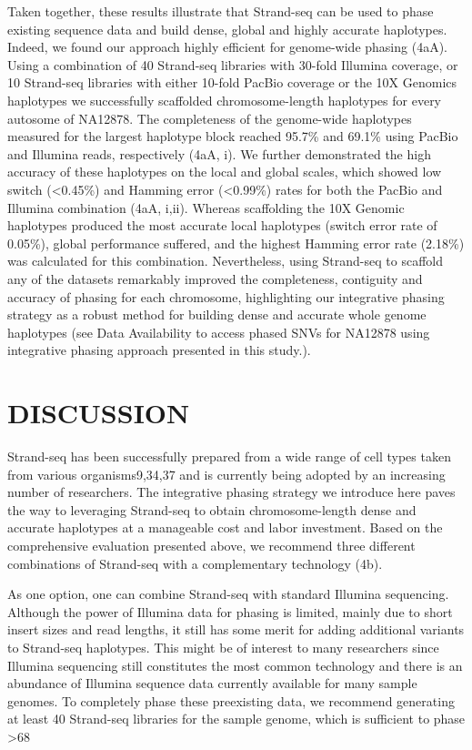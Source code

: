     Taken together, these results illustrate that Strand-seq can be used to phase existing sequence data and build dense, global and highly accurate haplotypes. 
    Indeed, we found our approach highly efficient for genome-wide phasing (4aA). Using a combination of 40 Strand-seq libraries with 30-fold Illumina coverage, 
    or 10 Strand-seq libraries with either 10-fold PacBio coverage or the 10X Genomics haplotypes we successfully scaffolded chromosome-length haplotypes for every autosome of NA12878. 
    The completeness of the genome-wide haplotypes measured for the largest haplotype block reached 95.7\% and 69.1\% using PacBio and Illumina reads, respectively (4aA, i). 
    We further demonstrated the high accuracy of these haplotypes on the local and global scales, which showed low switch (<0.45\%) and Hamming error (<0.99\%) rates for both the PacBio and Illumina combination (4aA, i,ii). 
    Whereas scaffolding the 10X Genomic haplotypes produced the most accurate local haplotypes (switch error rate of 0.05\%), global performance suffered, and the highest Hamming error rate (2.18\%) was calculated for this combination. 
    Nevertheless, using Strand-seq to scaffold any of the datasets remarkably improved the completeness, contiguity and accuracy of phasing for each chromosome, 
    highlighting our integrative phasing strategy as a robust method for building dense and accurate whole genome haplotypes (see Data Availability to access phased SNVs for NA12878 using integrative phasing approach presented in this study.). 
	




\section{DISCUSSION}
	Strand-seq has been successfully prepared from a wide range of cell types taken from various organisms9,34,37 and is currently being adopted by an increasing number of researchers. The integrative phasing strategy we introduce here paves the way to leveraging Strand-seq to obtain chromosome-length dense and accurate haplotypes at a manageable cost and labor investment. Based on the comprehensive evaluation presented above, we recommend three different combinations of Strand-seq with a complementary technology (4b).
	
	As one option, one can combine Strand-seq with standard Illumina sequencing. Although the power of Illumina data for phasing is limited, mainly due to short insert sizes and read lengths, it still has some merit for adding additional variants to Strand-seq haplotypes. This might be of interest to many researchers since Illumina sequencing still constitutes the most common technology and there is an abundance of Illumina sequence data currently available for many sample genomes. To completely phase these preexisting data, we recommend generating at least 40 Strand-seq libraries for the sample genome, which is sufficient to phase >68%
	
